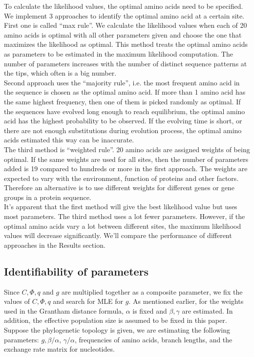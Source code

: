 \documentclass[13pt]{article}
\begin{document}
To calculate the likelihood values, the optimal amino acids need to be specified. We implement 3 approaches to identify the optimal amino acid at a certain site. First one is called ``max rule''. We calculate the likelihood values when each of 20 amino acids is optimal with all other parameters given and choose the one that maximizes the likelihood as optimal. This method treats the optimal amino acids as parameters to be estimated in the maximum likelihood computation. The number of parameters increases with the number of distinct sequence patterns at the tips, which often is a big number. \\
Second approach uses the ``majority rule'', i.e. the most frequent amino acid in the sequence is chosen as the optimal amino acid. If more than 1 amino acid has the same highest frequency, then one of them is picked randomly as optimal. If the sequences have evolved long enough to reach equilibrium, the optimal amino acid has the highest probability to be observed. If the evolving time is short, or there are not enough substitutions during evolution process, the optimal amino acids estimated this way can be inaccurate. \\
The third method is ``weighted rule''. 20 amino acids are assigned weights of being optimal. If the same weights are used for all sites, then the number of parameters added is 19 compared to hundreds or more in the first approach. The weights are expected to vary with the environment, function of proteins and other factors. Therefore an alternative is to use different weights for different genes or gene groups in a protein sequence. \\
It's apparent that the first method will give the best likelihood value but uses most parameters. The third method uses a lot fewer parameters. However, if the optimal amino acids vary a lot between different sites, the maximum likelihood values will decrease significantly. We'll compare the performance of different approaches in the Results section.\\

\subsection{Identifiability of parameters}
Since $C, \Phi, q$ and $g$ are multiplied together as a composite parameter, we fix the values of $C, \Phi, q$ and search for MLE for $g$. As mentioned earlier, for the weights used in the Grantham distance formula, $\alpha$ is fixed and $\beta, \gamma$ are estimated.  In addition, the effective population size is assumed to be fixed in this paper. Suppose the phylogenetic topology is given, we are estimating the following parameters: $g, \beta/\alpha$, $\gamma/\alpha$, frequencies of amino acids, branch lengths, and the exchange rate matrix for nucleotides. 
\end{document}
